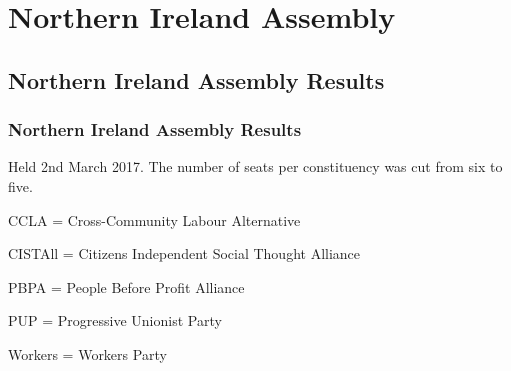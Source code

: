 \part{Northern Ireland Assembly}

\chapter{Northern Ireland Assembly Results}

\section{Northern Ireland Assembly Results}

Held 2nd March 2017.  The number of seats per constituency was cut from six to five.


CCLA = Cross-Community Labour Alternative

CISTAll = Citizens Independent Social Thought Alliance

%
%

PBPA = People Before Profit Alliance
%

PUP = Progressive Unionist Party
%
%
%

Workers = Workers Party

